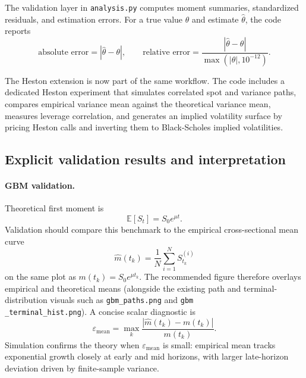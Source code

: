 \documentclass[11pt]{article}
\newcommand{\E}{\mathbb{E}}
\begin{document}
The validation layer in \texttt{analysis.py} computes moment summaries, standardized residuals, and estimation errors. For a true value $\theta$ and estimate $\hat\theta$, the code reports
\begin{equation}
  \text{absolute error} = |\hat\theta - \theta|,
  \qquad
  \text{relative error} = \frac{|\hat\theta - \theta|}{\max(|\theta|,10^{-12})}.
\end{equation}

The Heston extension is now part of the same workflow. The code includes a dedicated Heston experiment that simulates correlated spot and variance paths, compares empirical variance mean against the theoretical variance mean, measures leverage correlation, and generates an implied volatility surface by pricing Heston calls and inverting them to Black-Scholes implied volatilities.

\subsection{Explicit validation results and interpretation}

\paragraph{GBM validation.}
Theoretical first moment is
\begin{equation}
  \E[S_t] = S_0 e^{\mu t}.
\end{equation}
Validation should compare this benchmark to the empirical cross-sectional mean curve
\begin{equation}
  \widehat m(t_k) = \frac{1}{N}\sum_{i=1}^N S_{t_k}^{(i)}
\end{equation}
on the same plot as $m(t_k)=S_0e^{\mu t_k}$. The recommended figure therefore overlays empirical and theoretical means (alongside the existing path and terminal-distribution visuals such as \texttt{gbm\_paths.png} and \texttt{gbm\\_terminal\_hist.png}). A concise scalar diagnostic is
\begin{equation}
  \varepsilon_{\text{mean}} = \max_k \frac{|\widehat m(t_k)-m(t_k)|}{m(t_k)}.
\end{equation}
Simulation confirms the theory when $\varepsilon_{\text{mean}}$ is small: empirical mean tracks exponential growth closely at early and mid horizons, with larger late-horizon deviation driven by finite-sample variance.
\end{document}
